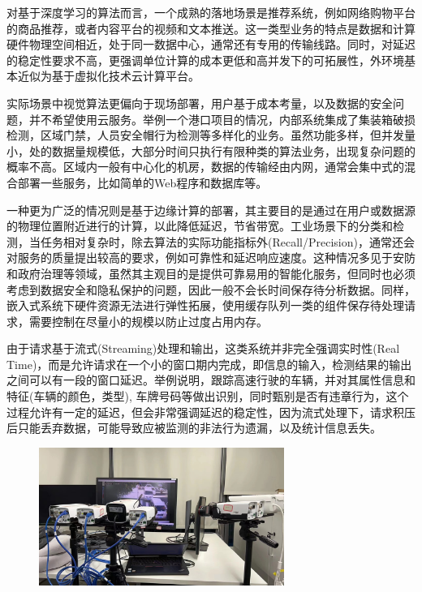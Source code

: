 \documentclass[master,anonymous]{shtthesis}
\begin{document}
对基于深度学习的算法而言，一个成熟的落地场景是推荐系统，例如网络购物平台的商品推荐，或者内容平台的视频和文本推送。这一类型业务的特点是数据和计算硬件物理空间相近，处于同一数据中心，通常还有专用的传输线路。同时，对延迟的稳定性要求不高，更强调单位计算的成本更低和高并发下的可拓展性，外环境基本近似为基于虚拟化技术云计算平台。

实际场景中视觉算法更偏向于现场部署，用户基于成本考量，以及数据的安全问题，并不希望使用云服务。举例一个港口项目的情况，内部系统集成了集装箱破损检测，区域门禁，人员安全帽行为检测等多样化的业务。虽然功能多样，但并发量小，处的数据量规模低，大部分时间只执行有限种类的算法业务，出现复杂问题的概率不高。区域内一般有中心化的机房，数据的传输经由内网，通常会集中式的混合部署一些服务，比如简单的Web程序和数据库等。

一种更为广泛的情况则是基于边缘计算的部署，其主要目的是通过在用户或数据源的物理位置附近进行的计算，以此降低延迟，节省带宽。工业场景下的分类和检测，当任务相对复杂时，除去算法的实际功能指标外(Recall/Precision)，通常还会对服务的质量提出较高的要求，例如可靠性和延迟响应速度。这种情况多见于安防和政府治理等领域，虽然其主观目的是提供可靠易用的智能化服务，但同时也必须考虑到数据安全和隐私保护的问题，因此一般不会长时间保存待分析数据。同样，嵌入式系统下硬件资源无法进行弹性拓展，使用缓存队列一类的组件保存待处理请求，需要控制在尽量小的规模以防止过度占用内存。

由于请求基于流式(Streaming)\cite{muthukrishnan2005data}处理和输出，这类系统并非完全强调实时性(Real Time)\cite{jaffe1990software}，而是允许请求在一个小的窗口期内完成，即信息的输入，检测结果的输出之间可以有一段的窗口延迟。举例说明，跟踪高速行驶的车辆，并对其属性信息和特征(车辆的颜色，类型), 车牌号码等做出识别，同时甄别是否有违章行为，这个过程允许有一定的延迟，但会非常强调延迟的稳定性，因为流式处理下，请求积压后只能丢弃数据，可能导致应被监测的非法行为遗漏，以及统计信息丢失。

\begin{figure}[H]
	\centering
	\includegraphics[width=8cm]{img/hd.jpeg}
	\label{有线直连的超清摄像头}
\end{figure}
\end{document}
